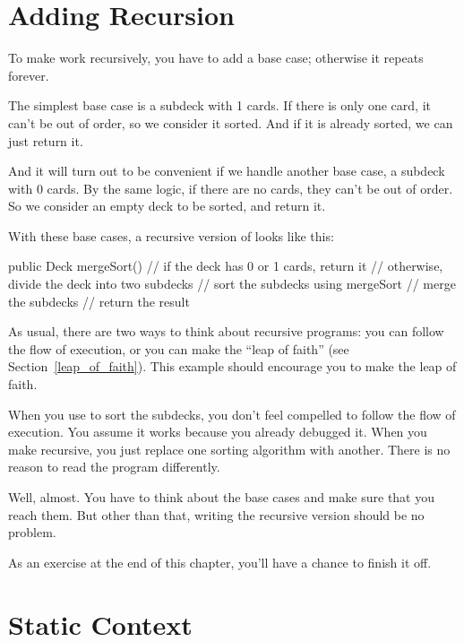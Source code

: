 \section{Adding Recursion}

To make  work recursively, you have to add a base case; otherwise it repeats forever.

The simplest base case is a subdeck with 1 cards.
If there is only one card, it can't be out of order, so we consider it sorted.
And if it is already sorted, we can just return it.

And it will turn out to be convenient if we handle another base case, a subdeck with 0 cards.
By the same logic, if there are no cards, they can't be out of order.
So we consider an empty deck to be sorted, and return it.

With these base cases, a recursive version of  looks like this:

\begin{code}
public Deck mergeSort() {
    // if the deck has 0 or 1 cards, return it
    // otherwise, divide the deck into two subdecks
    // sort the subdecks using mergeSort
    // merge the subdecks
    // return the result
}
\end{code}


As usual, there are two ways to think about recursive programs: you can follow the flow of execution, or you can make the ``leap of faith'' (see Section~\ref{leap_of_faith}).
This example should encourage you to make the leap of faith.

When you use  to sort the subdecks, you don't feel compelled to follow the flow of execution.
You assume it works because you already debugged it.
When you make  recursive, you just replace one sorting algorithm with another.
There is no reason to read the program differently.

Well, almost.
You have to think about the base cases and make sure that you reach them.
But other than that, writing the recursive version should be no problem.

As an exercise at the end of this chapter, you'll have a chance to finish it off.


\section{Static Context}

